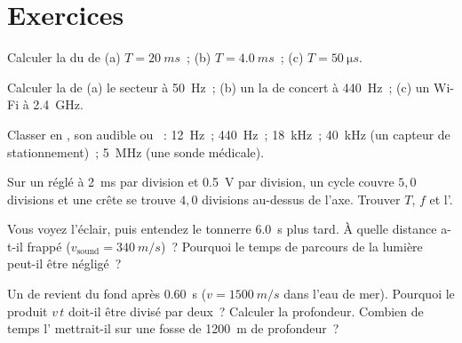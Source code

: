 \section{Exercices}

\begin{exercise}[$\star$]\label{exo:g10:signals-and-waves:1}
Calculer la  du 
de  (a) $T = \qty{20}{ms}$~; (b)
$T = \qty{4.0}{ms}$~; (c) $T = \qty{50}{\micro s}$.
\end{exercise}

\begin{exercise}[$\star$]\label{exo:g10:signals-and-waves:2}
Calculer la  de (a) le secteur à \qty{50}{Hz}~;
(b) un la de concert à \qty{440}{Hz}~; (c) un 
Wi-Fi à \qty{2.4}{GHz}.
\end{exercise}

\begin{exercise}[$\star$]\label{exo:g10:signals-and-waves:3}
Classer en , son audible ou
~: \qty{12}{Hz}~; \qty{440}{Hz}~; \qty{18}{kHz}~;
\qty{40}{kHz} (un capteur de stationnement)~; \qty{5}{MHz} (une sonde
médicale).
\end{exercise}

\begin{exercise}[$\star$]\label{exo:g10:signals-and-waves:4}
Sur un  réglé à \qty{2}{ms} par division
et \qty{0.5}{V} par division, un cycle couvre $5{,}0$ divisions et une
crête se trouve $4{,}0$ divisions au-dessus de l'axe. Trouver $T$, $f$
et l'.
\end{exercise}

\begin{exercise}[$\star$]\label{exo:g10:signals-and-waves:5}
Vous voyez l'éclair, puis entendez le tonnerre \qty{6.0}{s} plus tard.
À quelle distance a-t-il frappé
($v_{\text{sound}} = \qty{340}{m/s}$)~? Pourquoi le temps de parcours
de la lumière peut-il être négligé~?
\end{exercise}

\begin{exercise}[$\star\star$]\label{exo:g10:signals-and-waves:6}
Un  de  revient du fond après
\qty{0.60}{s} ($v = \qty{1500}{m/s}$ dans l'eau de mer). Pourquoi le
produit $v\,t$ doit-il être divisé par deux~? Calculer la profondeur.
Combien de temps l' mettrait-il sur une fosse de
\qty{1200}{m} de profondeur~?
\end{exercise}

